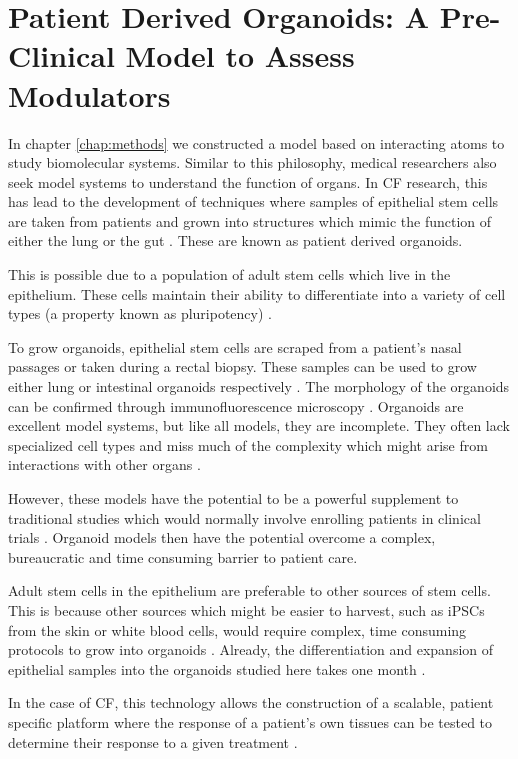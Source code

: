 \section{Patient Derived Organoids: A Pre-Clinical Model to Assess Modulators}
In chapter \ref{chap:methods} we constructed a model based on interacting atoms to study biomolecular systems. Similar to this philosophy, medical researchers also seek model systems to understand the function of organs. In CF research, this has lead to the development of techniques where samples of epithelial stem cells are taken from patients and grown into structures which mimic the function of either the lung or the gut \cite{wong2015,depoel2020}. These are known as patient derived organoids.

This is possible due to a population of adult stem cells which live in the epithelium. These cells maintain their ability to differentiate into a variety of cell types (a property known as pluripotency) \cite{blanpain2007}. 

To grow organoids, epithelial stem cells are scraped from a patient's nasal passages or taken during a rectal biopsy. These samples can be used to grow either lung or intestinal organoids respectively  \cite{awatade2021,sato2011}. The morphology of the organoids can be confirmed through immunofluorescence microscopy \cite{awatade2021, im2019}. Organoids are excellent model systems, but like all models, they are incomplete. They often lack specialized cell types and miss much of the complexity which might arise from interactions with other organs \cite{clevers2016}. 

However, these models have the potential to be a powerful supplement to traditional studies which would normally involve enrolling patients in clinical trials \cite{pranke2019a}. Organoid models then have the potential overcome a complex, bureaucratic and time consuming barrier to patient care.

Adult stem cells in the epithelium are preferable to other sources of stem cells. This is because other sources which might be easier to harvest, such as iPSCs from the skin or white blood cells, would require complex, time consuming protocols to grow into organoids \cite{wong2012}. Already, the differentiation and expansion of epithelial samples into the organoids studied here takes one month \cite{sato2011}.

In the case of CF, this technology allows the construction of a scalable, patient specific platform where the response of a patient's own tissues can be tested to determine their response to a given treatment \cite{keegan2021, sato2011}. 

